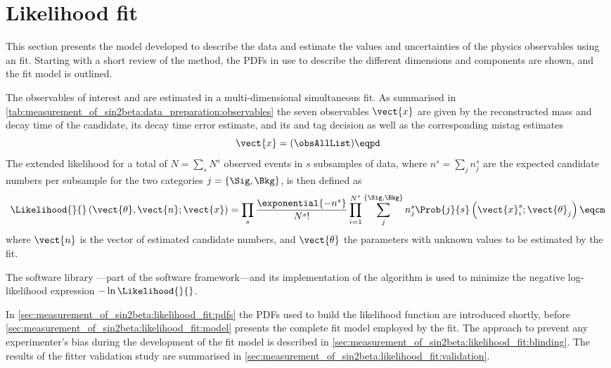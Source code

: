 
\section{Likelihood fit}
\label{sec:measurement_of_sin2beta:likelihood_fit}

This section presents the model developed to describe the data and estimate the
values and uncertainties of the physics observables using an \uEML fit. Starting
with a short review of the \uEML method, the \acp{PDF} in use to describe the
different dimensions and components are shown, and the fit model is outlined.

The \CP observables of interest \SJpsiKS and \CJpsiKS are estimated in a
multi-dimensional simultaneous \uEML fit. As summarised in
\cref{tab:measurement_of_sin2beta:data_preparation:observables} the seven
observables $\vect{x}$ are given by the reconstructed mass and decay time of the
\Bd candidate, its decay time error estimate, and its \OS and \SSpi tag decision
as well as the corresponding mistag estimates
%
\begin{equation}\label{eq:measurement_of_sin2beta:likelihood_fit:observables}
  \vect{x} = (\obsAllList)\eqpd  
\end{equation}
%
The extended likelihood for a total of $N = \sum_s N^s$ observed events in $s$
subsamples of data, where $n^s = \sum_j n_j^s$ are the expected candidate
numbers per subsample for the two categories $j = \{\Sig,\Bkg\}$, is then
defined as
%
\begin{equation}\label{eq:measurement_of_sin2beta:likelihood_fit:uEML}
  \Likelihood{}{}\left(\vect{\theta},\vect{n};\vect{x}\right) = \prod_{s}^{}\frac{\exponential{-n^s}}{N^s!} \prod_{i=1}^{N^s} \sum_{j}^{\{\Sig,\Bkg\}} n_{j}^{s} \Prob{j}{s} \left( \vect{x}_{i}^{s} ; \vect{\theta}_j \right )\eqcm
\end{equation}
%
where $\vect{n}$ is the vector of estimated candidate numbers, and
$\vect{\theta}$ the parameters with unknown values to be estimated by the \uEML
fit.

The software library \RooFit \cite{Verkerke:2003ir}---part of the \ROOT
\cite{Antcheva:2011zz} software framework---and its implementation of the
\Minuit algorithm is used to minimize the negative log-likelihood expression
$-\ln\Likelihood{}{}$.

In \cref{sec:measurement_of_sin2beta:likelihood_fit:pdfs} the \acp{PDF} used to
build the likelihood function are introduced shortly, before
\cref{sec:measurement_of_sin2beta:likelihood_fit:model} presents the complete
fit model employed by the \uEML fit. The approach to prevent any experimenter's
bias during the development of the fit model is described in
\cref{sec:measurement_of_sin2beta:likelihood_fit:blinding}. The results of the
fitter validation study are summarised in
\cref{sec:measurement_of_sin2beta:likelihood_fit:validation}.

